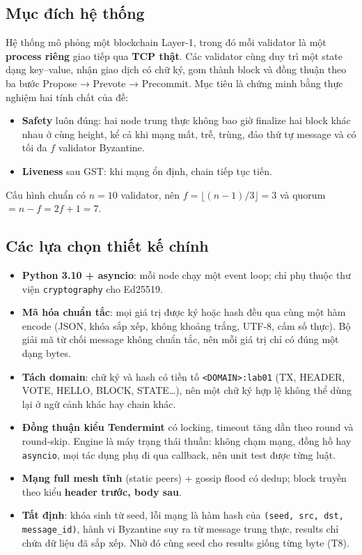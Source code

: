 \documentclass[11pt,a4paper]{article}
\newcommand{\code}[1]{\texttt{#1}}
\begin{document}
\subsection{Mục đích hệ thống}
Hệ thống mô phỏng một blockchain Layer-1, trong đó mỗi validator là một \textbf{process riêng} giao tiếp qua \textbf{TCP thật}. Các validator cùng duy trì một state dạng key--value, nhận giao dịch có chữ ký, gom thành block và đồng thuận theo ba bước Propose → Prevote → Precommit. Mục tiêu là chứng minh bằng thực nghiệm hai tính chất của đề:
\begin{itemize}
\item \textbf{Safety} luôn đúng: hai node trung thực không bao giờ finalize hai block khác nhau ở cùng height, kể cả khi mạng mất, trễ, trùng, đảo thứ tự message và có tối đa $f$ validator Byzantine.
\item \textbf{Liveness} sau GST: khi mạng ổn định, chain tiếp tục tiến.
\end{itemize}
Cấu hình chuẩn có $n = 10$ validator, nên $f = \lfloor (n-1)/3 \rfloor = 3$ và quorum $= n - f = 2f+1 = 7$.

\subsection{Các lựa chọn thiết kế chính}
\begin{itemize}
\item \textbf{Python 3.10 + asyncio}: mỗi node chạy một event loop; chỉ phụ thuộc thư viện \code{cryptography} cho Ed25519.
\item \textbf{Mã hóa chuẩn tắc}: mọi giá trị được ký hoặc hash đều qua cùng một hàm encode (JSON, khóa sắp xếp, không khoảng trắng, UTF-8, cấm số thực). Bộ giải mã từ chối message không chuẩn tắc, nên mỗi giá trị chỉ có đúng một dạng bytes.
\item \textbf{Tách domain}: chữ ký và hash có tiền tố \code{<DOMAIN>:lab01} (TX, HEADER, VOTE, HELLO, BLOCK, STATE…), nên một chữ ký hợp lệ không thể dùng lại ở ngữ cảnh khác hay chain khác.
\item \textbf{Đồng thuận kiểu Tendermint} có locking, timeout tăng dần theo round và round-skip. Engine là máy trạng thái thuần: không chạm mạng, đồng hồ hay \code{asyncio}, mọi tác dụng phụ đi qua callback, nên unit test được từng luật.
\item \textbf{Mạng full mesh tĩnh} (static peers) + gossip flood có dedup; block truyền theo kiểu \textbf{header trước, body sau}.
\item \textbf{Tất định}: khóa sinh từ seed, lỗi mạng là hàm hash của \code{(seed, src, dst, message\_id)}, hành vi Byzantine suy ra từ message trung thực, results chỉ chứa dữ liệu đã sắp xếp. Nhờ đó cùng seed cho results giống từng byte (T8).
\end{itemize}
\end{document}
